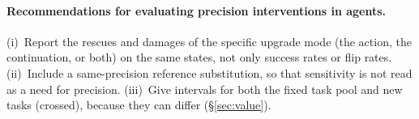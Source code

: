 \paragraph{Recommendations for evaluating precision interventions in agents.} (i)~Report the rescues and damages of the specific upgrade mode (the action, the continuation, or both) on the same states, not only success rates or flip rates. (ii)~Include a same-precision reference substitution, so that sensitivity is not read as a need for precision. (iii)~Give intervals for both the fixed task pool and new tasks (crossed), because they can differ (\S\ref{sec:value}). %

